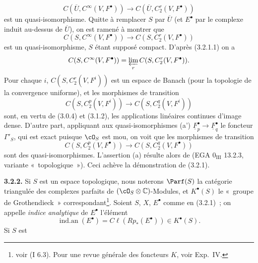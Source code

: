 \[
  C(\overline U,C^\infty(V,F^\bullet))
  \longrightarrow C(\overline U,C_2^r(V,F^\bullet))
\]
est un
quasi-isomorphisme. Quitte à remplacer $S$ par $\overline U$ (et $E^\bullet$ par le complexe induit au-dessus de $\overline U$), on est ramené à montrer que
\[
  C(S,C^\infty(V,F^\bullet))
  \longrightarrow C(S,C_2^r(V,F^\bullet))
\]
est un quasi-isomorphisme, $S$ étant supposé compact. D'après (3.2.1.1) on a
\[
  C(S,C^\infty(V,F^\bullet))=
  \varprojlim_r C(S,C_2^r(V,F^\bullet)).
\]
Pour chaque $i$, $C(S,C_2^r(V,F^i))$ est un espace de Banach (pour la topologie de la convergence uniforme), et les morphismes de transition
\[
  C(S,C_2^p(V,F^i))\longrightarrow C(S,C_2^q(V,F^i))
\]
sont, en vertu de (3.0.4) et (3.1.2), les applications linéaires continues d'image dense. D'autre part, appliquant aux quasi-isomorphismes (a') $\underline F_p^\bullet\longrightarrow\underline F_q^\bullet$ le foncteur $\Gamma'_S$, qui est exact puisque $\cO_S$ est mou, on voit que les morphismes de transition
\[
  C(S,C_2^p(V,F^\bullet))\longrightarrow C(S,C_2^q(V,F^\bullet))
\]
sont des quasi-isomorphismes. L'assertion (a) résulte alors de (EGA $0_{\mathrm{III}}$ 13.2.3, variante «~topologique~»). Ceci achève la démonstration de (3.2.1).

\textbf{3.2.2.} Si $S$ est un espace topologique, nous noterons $\Parf(S)$ la catégorie triangulée des complexes parfaits de $(\cO_S\otimes\mathbb C)$-Modules, et $K^\bullet(S)$ le «~groupe de Grothendieck~» correspondant\footnote{voir (I 6.3). Pour une revue générale des foncteurs $K$, voir Exp.~IV.}. Soient $S$, $X$, $E^\bullet$ comme en (3.2.1)~; on appelle \emph{indice analytique} de $E^\bullet$ l'élément
\[
  \operatorname{ind.an}(E^\bullet)=C\ell(Rp_*(E^\bullet))\in K^\bullet(S).
\]
Si $S$ est
